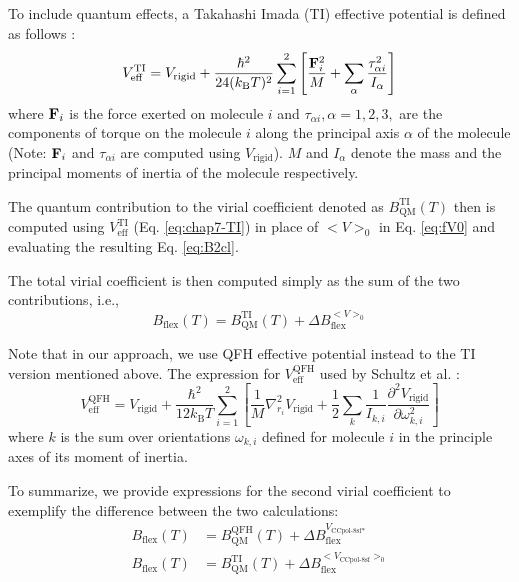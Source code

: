             To include quantum effects, a Takahashi Imada (TI) \cite{Takahashi1984} effective potential is defined as follows \cite{Schenter2002,Jankowski2015}:
            \begin{equation}
            \label{eq:chap7-TI}
                V^\text{TI}_\text{eff} = V_{\text{rigid}} + \displaystyle\frac{\hbar^2}{24 (k_\text{B} T)^2} \sum_{i = 1}^2 \left[ \frac{{\mathbf {F}}_i^2}{M} + \sum_\alpha \frac{\tau_{\alpha i}^2}{I_\alpha} \right]
            \end{equation}
            where ${\mathbf {F}}_i$ is the force exerted on molecule $i$ and $\tau_{\alpha i}, \alpha = 1, 2, 3,$ are the components of torque on the molecule $i$ along the principal axis $\alpha$ of the molecule (Note: ${\mathbf {F}}_i$ and $\tau_{\alpha i}$ are computed using $V_{\text{rigid}}$). $M$ and $I_\alpha$ denote the mass and the principal moments of inertia of the molecule respectively.

            The quantum contribution to the virial coefficient denoted as $B_\text{QM}^\text{TI} (T)$ then is computed using $V^\text{TI}_\text{eff}$ (Eq. \eqref{eq:chap7-TI}) in place of $<V>_0$ in Eq. \eqref{eq:fV0} and evaluating the resulting Eq. \eqref{eq:B2cl}.

            The total virial coefficient is then computed simply as the sum of the two contributions, i.e.,
            \begin{equation}
                 B_\text{flex} (T) = B_\text{QM}^\text{TI} (T) + \Delta B_\text{flex}^{<V>_0}
            \end{equation}

            Note that in our approach, we use QFH effective potential instead to the TI version mentioned above. The expression for $V^\text{QFH}_\text{eff}$ used by Schultz et al. \cite{Schultz2015,Feynman}:
            \begin{equation}
                \label{eq:chap7-QFH}
                V^\text{QFH}_\text{eff} = V_{\text{rigid}} + \displaystyle\frac{\hbar^2}{12 k_\text{B} T} \sum_{i = 1}^2 \left[ \frac{1}{M} \nabla^2_{r_i} V_\text{rigid} + \frac{1}{2} \sum_k \frac{1}{I_{k,i}} \frac{\partial^2 V_\text{rigid}}{\partial \omega_{k,i}^2} \right]
            \end{equation}
            where $k$ is the sum over orientations $\omega_{k,i}$ defined for molecule $i$ in the principle axes of its moment of inertia.
            
            To summarize, we provide expressions for the second virial coefficient to exemplify the difference between the two calculations:
            \begin{subequations}
                \label{eq:B2Total}
                \begin{align}
                    B_\text{flex} (T) &= B_\text{QM}^\text{QFH} (T) + \Delta B_\text{flex}^{V_\text{CCpol-8sf*}}\\
                    B_\text{flex} (T) &= B_\text{QM}^\text{TI} (T) + \Delta B_\text{flex}^{<V_\text{CCpol-8sf}>_0}
                \end{align}
            \end{subequations}
